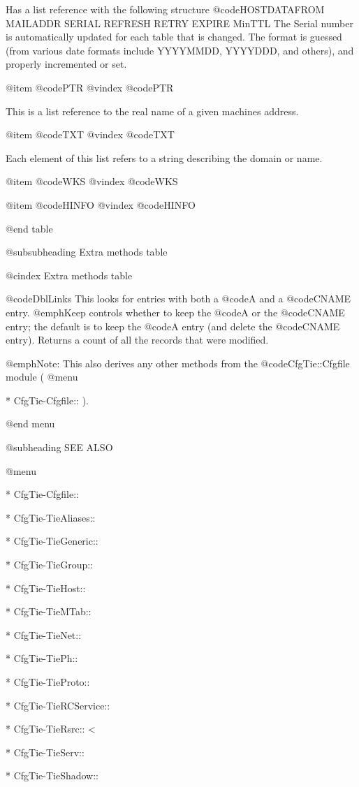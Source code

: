 {{{{{{{{{{{{Has a list reference with the following structure
@code{HOSTDATAFROM MAILADDR SERIAL REFRESH RETRY EXPIRE MinTTL}
The Serial number is automatically updated for each table that is changed.
The format is guessed (from various date formats include YYYYMMDD, YYYYDDD,
and others), and properly incremented or set.

@item @code{PTR}
@vindex @code{PTR}

This is a list reference to the real name of a given machines address.

@item @code{TXT}
@vindex @code{TXT}

Each element of this list refers to a string describing the domain or name.

@item @code{WKS}
@vindex @code{WKS}

@item @code{HINFO}
@vindex @code{HINFO}

@end table

@subsubheading Extra methods table

@cindex Extra methods table

@code{DblLinks} This looks for entries with both a @code{A} and a @code{CNAME} entry.
@emph{Keep} controls whether to keep the @code{A} or the @code{CNAME} entry; the default
is to keep the @code{A} entry (and delete the @code{CNAME} entry).  Returns a count
of all the records that were modified.

@emph{Note:} This also derives any other methods from the @code{CfgTie::Cfgfile} module
(
@menu

* CfgTie-Cfgfile::	
).

@end menu

@subheading SEE ALSO


@menu

* CfgTie-Cfgfile::	


* CfgTie-TieAliases::	
 
* CfgTie-TieGeneric::	
   
* CfgTie-TieGroup::	


* CfgTie-TieHost::	
    
* CfgTie-TieMTab::	
      
* CfgTie-TieNet::	


* CfgTie-TiePh::	


* CfgTie-TieProto::	
   
* CfgTie-TieRCService::	
 
* CfgTie-TieRsrc::	
<

* CfgTie-TieServ::	


* CfgTie-TieShadow::	
  
}}}}}}}}}}}}
